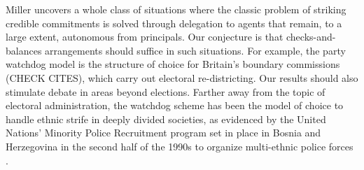 \documentclass[12 pt, letter]{article}
\renewcommand{\footnote}{\endnote}
\begin{document}
Miller \citeyearpar{Miller2005} uncovers a whole class of situations where the classic problem of striking credible commitments is solved through delegation to agents that remain, to a large extent, autonomous from principals. Our conjecture is that checks-and-balances arrangements should suffice in such situations.  For example, the party watchdog model is the structure of choice for Britain's boundary commissions (CHECK CITES), which carry out electoral re-districting.  Our results should also stimulate debate in areas beyond elections. Farther away from the topic of electoral administration, the watchdog scheme has been the model of choice to handle ethnic strife in deeply divided societies, as evidenced by the United Nations' Minority Police Recruitment program set in place in Bosnia and Herzegovina in the second half of the 1990s to organize multi-ethnic police forces \citep{Collantes2005}.


\pagebreak
\theendnotes

\pagebreak


\end{document}
